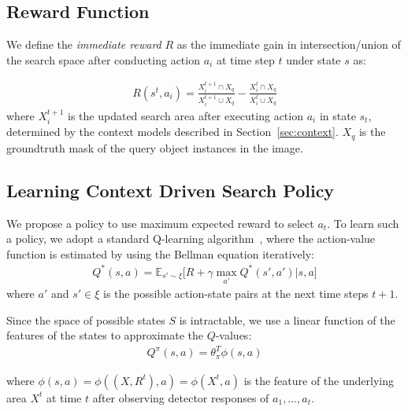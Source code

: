 \subsection{Reward Function}

We define the \textit{immediate reward} $R$ as the immediate gain in intersection/union of the search space after conducting action $a_i$ at time step $t$ under state $s$ as:

\begin{eqnarray}
\label{eq:imreward}
R(s^t,a_i) =  \frac{X^{t+1}_i \cap X_q}{X^{t+1}_i \cup X_q} - \frac{X^{t}_i \cap X_q}{X^{t}_i \cup X_q}
\end{eqnarray}
where $X^{t+1}_i$ is the updated search area after executing action $a_i$ in state $s_t$, determined by the context models described in Section~\ref{sec:context}. $X_q$ is the groundtruth mask of the query object instances in the image. 
  




\subsection{Learning Context Driven Search Policy}
We propose a policy to use maximum expected reward to select $a_t$. To learn such a policy, we adopt a standard Q-learning algorithm~\cite{barto1998reinforcement}, where the action-value function is estimated by using the Bellman equation iteratively:
\begin{eqnarray}
\label{eq:bellman}
Q^*(s,a) = \mathbb{E}_{s'\sim \xi} \big[ R + \gamma \max_{a'} Q^*(s',a')|s,a \big]
\end{eqnarray}
where $a'$ and $s'\in\xi$ is the possible action-state pairs at the next time steps $t+1$.

Since the space of possible states $S$ is intractable, we use a linear function of the features of the states to approximate the $Q$-values:
\begin{eqnarray}
\label{eq:qvalue}
Q^{\pi}(s,a) = \theta_\pi^T \phi(s,a) 
\end{eqnarray}

where $\phi(s,a) = \phi((X, R^t),a) = \phi(X^t,a)$ is the feature of the underlying area $X^t$ at time $t$ after observing detector responses of $a_1,...,a_t$. 

